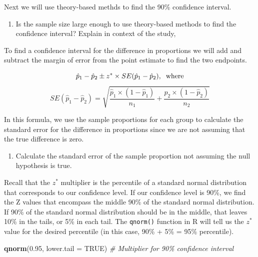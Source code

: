 \documentclass[
]{report}
\newenvironment{Shaded}{\begin{snugshade}}{\end{snugshade}}
\newcommand{\AttributeTok}[1]{\textcolor[rgb]{0.13,0.29,0.53}{#1}}
\newcommand{\CommentTok}[1]{\textcolor[rgb]{0.56,0.35,0.01}{\textit{#1}}}
\newcommand{\ConstantTok}[1]{\textcolor[rgb]{0.56,0.35,0.01}{#1}}
\newcommand{\FloatTok}[1]{\textcolor[rgb]{0.00,0.00,0.81}{#1}}
\newcommand{\FunctionTok}[1]{\textcolor[rgb]{0.13,0.29,0.53}{\textbf{#1}}}
\newcommand{\NormalTok}[1]{#1}
\providecommand{\tightlist}{%
  \setlength{\itemsep}{0pt}\setlength{\parskip}{0pt}}
\begin{document}
Next we will use theory-based methds to find the 90\% confidence interval.

\begin{enumerate}
\def\labelenumi{\arabic{enumi}.}
\setcounter{enumi}{9}
\tightlist
\item
  Is the sample size large enough to use theory-based methods to find the confidence interval? Explain in context of the study,
\end{enumerate}

\vspace{1.2in}

To find a confidence interval for the difference in proportions we will add and subtract the margin of error from the point estimate to find the two endpoints.

\[\hat{p}_1-\hat{p}_2\pm z^*\times SE(\hat{p}_1-\hat{p}_2), \hspace{.2cm} \text{where}\]
\[SE(\hat{p}_1-\hat{p}_2) = \sqrt{\frac{\hat{p}_1 \times  (1-\hat{p}_1)}{n_1}+\frac{\hat{p}_2 \times  (1-\hat{p}_2)}{n_2}}\]

In this formula, we use the sample proportions for each group to calculate the standard error for the difference in proportions since we are not assuming that the true difference is zero.

\begin{enumerate}
\def\labelenumi{\arabic{enumi}.}
\setcounter{enumi}{10}
\tightlist
\item
  Calculate the standard error of the sample proportion not assuming the null hypothesis is true.
\end{enumerate}

\vspace{1in}

Recall that the \(z^*\) multiplier is the percentile of a standard normal distribution that corresponds to our confidence level. If our confidence level is 90\%, we find the Z values that encompass the middle 90\% of the standard normal distribution. If 90\% of the standard normal distribution should be in the middle, that leaves 10\% in the tails, or 5\% in each tail. The \texttt{qnorm()} function in R will tell us the \(z^*\) value for the desired percentile (in this case, 90\% + 5\% = 95\% percentile).

\begin{Shaded}
\begin{Highlighting}[]
\FunctionTok{qnorm}\NormalTok{(}\FloatTok{0.95}\NormalTok{, }\AttributeTok{lower.tail =} \ConstantTok{TRUE}\NormalTok{) }\CommentTok{\# Multiplier for 90\% confidence interval}
\end{Highlighting}
\end{Shaded}
\end{document}

